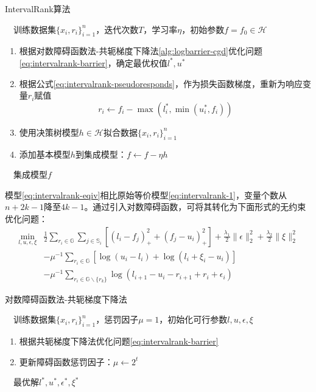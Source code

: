 \begin{algorithm}[htbp]
        \caption{IntervalRank算法}
        \begin{algorithmic}
            \REQUIRE ~~训练数据集$\{x_i,r_i\}_{i=1}^n$，迭代次数$T$，学习率$\eta$，初始参数$f=f_0\in \mathcal{H}$\\
            \STATE
            \begin{enumerate}
              \item 根据对数障碍函数法-共轭梯度下降法\eqref{alg:logbarrier-cgd}优化问题\eqref{eq:intervalrank-barrier}，确定最优权值$l^*,u^*$
              \item 根据公式\eqref{eq:intervalrank-pseudoresponds}，作为损失函数梯度，重新为响应变量$r_i$赋值
              \[
                r_i \leftarrow f_i - \max(l_i^*,\min(u_i^*,f_i))
              \]
              \item 使用决策树模型$h\in \mathcal{H}$拟合数据$\{x_i,r_i\}_{i=1}^n$
              \item 添加基本模型$h$到集成模型：$f\leftarrow f - \eta h$
            \end{enumerate}
            \ENDFOR
            \ENSURE ~~集成模型$f$
        \end{algorithmic}
\end{algorithm}

模型\eqref{eq:intervalrank-eqiv}相比原始等价模型\eqref{eq:intervalrank-1}，变量个数从$n + 2k - 1$降至$4k-1$。通过引入对数障碍函数，可将其转化为下面形式的无约束优化问题：
\begin{equation}\label{eq:intervalrank-barrier}
\begin{array}{ll}
  \min\limits_{l,u,\epsilon,\xi} & \frac{1}{2} \sum\limits_{r_i\in \mathbb{G}}\sum\limits_{j\in \mathbb{S}_i} [(l_i - f_j)_{+}^2 + (f_j - u_i)_{+}^2]
      + \frac{\lambda_1}{2} \| \epsilon\|_2^2 + \frac{\lambda_2}{2}\|\xi\|_2^2\\
      & - \mu^{-1} \sum\limits_{r_i \in \mathbb{G}}[\log(u_i - l_i) + \log(l_i + \xi_i - u_i)]\\
      & - \mu^{-1} \sum\limits_{r_i \in \mathbb{G} \backslash \{r_k\}} \log(l_{i+1} - u_i - r_{i+1} + r_i + \epsilon_i)
\end{array}
\end{equation}


\begin{algorithm}[htbp]
        \caption{对数障碍函数法-共轭梯度下降法}\label{alg:logbarrier-cgd}
        \begin{algorithmic}
            \REQUIRE ~~训练数据集$\{x_i,r_i\}_{i=1}^n$，惩罚因子$\mu=1$，初始化可行参数$l,u,\epsilon,\xi$\\
            \STATE
            \begin{enumerate}
              \item 根据共轭梯度下降法优化问题\eqref{eq:intervalrank-barrier}
              \item 更新障碍函数惩罚因子：$\mu \leftarrow 2^t$
            \end{enumerate}
            \ENDFOR
            \ENSURE~~最优解$l^*,u^*,\epsilon^*,\xi^*$
        \end{algorithmic}
\end{algorithm}

